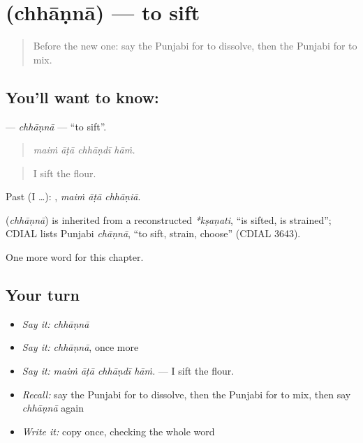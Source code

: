\section[\texorpdfstring{\pa{ਛਾਣਨਾ} (chhāṇnā)}{ਛਾਣਨਾ (chhāṇnā)}]{ (chhāṇnā) — to sift}

\label{lesson:PA-C243-chhanna}



\begin{quote}
Before the new one: say the Punjabi for to dissolve, then the Punjabi for to mix.
\end{quote}

\subsection*{You'll want to know: }
\textbf{} — \emph{chhāṇnā} — \textquotedblleft{}to sift\textquotedblright{}.

\begin{quote}
   
\end{quote}

\begin{quote}
\emph{maiṁ āṭā chhāṇdī hāṁ.}
\end{quote}

\begin{quote}
I sift the flour.
\end{quote}

Past (I …):   , \emph{maiṁ āṭā chhāṇiā}.

\begin{cousinweb}
\textbf{} (\emph{chhāṇnā}) is inherited from a reconstructed \emph{*kṣaṇati}, \textquotedblleft{}is sifted, is strained\textquotedblright{}; CDIAL lists Punjabi \emph{chāṇnā}, \textquotedblleft{}to sift, strain, choose\textquotedblright{} (CDIAL 3643).
\end{cousinweb}

\begin{grammarlens}[title={What you've built}]
One more word for this chapter.
\end{grammarlens}

\subsection*{Your turn}
\begin{itemize}
\raggedright
  \item \emph{Say it:} \emph{chhāṇnā}
  \item \emph{Say it:} \emph{chhāṇnā}, once more
  \item \emph{Say it:} \emph{maiṁ āṭā chhāṇdī hāṁ.} — I sift the flour.
  \item \emph{Recall:} say the Punjabi for to dissolve, then the Punjabi for to mix, then say \emph{chhāṇnā} again
  \item \emph{Write it:} copy \textbf{} once, checking the whole word
\end{itemize}

